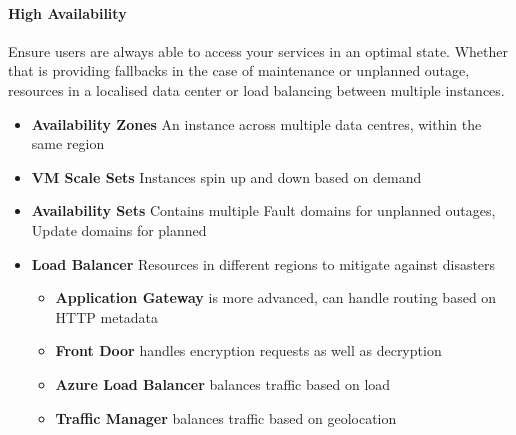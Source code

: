 \documentclass[a4paper,14pt]{report}
\begin{document}
    \paragraph{High Availability}
    Ensure users are always able to access your services in an optimal state. Whether that is providing fallbacks in the case of maintenance or unplanned outage, resources in a localised data center or load balancing between multiple instances.
    \begin{itemize}
        \item \textbf{Availability Zones} An instance across multiple data centres, within the same region
        \item \textbf{VM Scale Sets} Instances spin up and down based on demand
        \item \textbf{Availability Sets} Contains multiple Fault domains for unplanned outages, Update domains for planned
        \item \textbf{Load Balancer} Resources in different regions to mitigate against disasters
        \begin{itemize}
            \item \textbf{Application Gateway} is more advanced, can handle routing based on HTTP metadata
            \item \textbf{Front Door} handles encryption requests as well as decryption
            \item \textbf{Azure Load Balancer} balances traffic based on load
            \item \textbf{Traffic Manager} balances traffic based on geolocation
        \end{itemize}
    \end{itemize}
\end{document}
